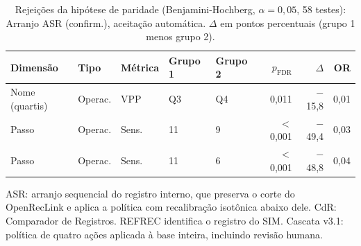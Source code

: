 \begin{table}[htbp]
\centering
\caption{Rejei\c{c}\~oes da hip\'otese de paridade (Benjamini-Hochberg, $\alpha = 0{,}05$, 58 testes): Arranjo ASR (confirm.), aceitação automática. $\Delta$ em pontos percentuais (grupo 1 menos grupo 2).}
\label{tab:equidade-arranjo-rejeicoes-arranjo-P-confirmacao}
\footnotesize\setlength{\tabcolsep}{3pt}
\begin{tabular}{lllllrrr}
\toprule
Dimens\~ao & Tipo & M\'etrica & Grupo 1 & Grupo 2 & $p_{\mathrm{FDR}}$ & $\Delta$ & OR \\
\midrule
Nome (quartis) & Operac. & VPP & Q3 & Q4 & 0{,}011 & $-$15{,}8 & 0{,}01 \\
Passo & Operac. & Sens. & 11 & 9 & $<$0{,}001 & $-$49{,}4 & 0{,}03 \\
Passo & Operac. & Sens. & 11 & 6 & $<$0{,}001 & $-$48{,}8 & 0{,}04 \\
\bottomrule
\end{tabular}
\par{}\par\footnotesize ASR: arranjo sequencial do registro interno, que preserva o corte do OpenRecLink e aplica a política com recalibração isotônica abaixo dele. CdR: Comparador de Registros. REFREC identifica o registro do SIM. Cascata v3.1: política de quatro ações aplicada à base inteira, incluindo revisão humana.
\end{table}
